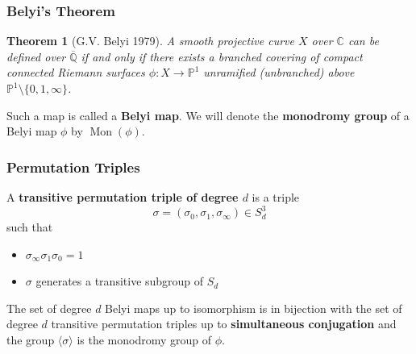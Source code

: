 \documentclass[handout, xcolor=dvipsnames]{beamer}
\DeclareMathOperator{\Mon}{Mon}
\theoremstyle{plain}
\newtheorem*{thm}{Theorem}
\newtheorem*{ques}{Question}
\newcommand{\CC}{\mathbb C}
\newcommand{\PP}{\mathbb P}
\newcommand{\Q}{\mathbb Q}
\newcommand{\defi}[1]{\textbf{#1}} 				%
\begin{document}
  \begin{frame}[plain]
    \frametitle{Belyi's Theorem}
    \begin{thm}[G.V. Belyi 1979]
      A smooth projective curve $X$ over $\CC$
      can be defined over $\overline{\Q}$ if and only if there
      exists a branched covering of compact connected Riemann surfaces $\phi:X\to\PP^1$
      unramified (unbranched) above $\PP^1\setminus\{0,1,\infty\}$.
    \end{thm}
    \pause
    Such a map is called a \textbf{Belyi map}.
    We will denote the \textbf{monodromy group} of a Belyi map $\phi$ by $\Mon(\phi)$.
  \end{frame}
  \begin{frame}[plain]
    \frametitle{Permutation Triples}
    A \textbf{transitive permutation triple of degree $d$} is a triple
    \[
      \sigma = (\sigma_0, \sigma_1, \sigma_\infty)\in S_d^3
    \]
    such that
    \begin{itemize}
      \item
        $\sigma_\infty\sigma_1\sigma_0=1$
      \item
        $\sigma$ generates a transitive subgroup of $S_d$
    \end{itemize}
    \pause
    The set of degree $d$ Belyi maps up to isomorphism is in bijection with the
    set of degree $d$ transitive permutation triples up to
    \textbf{simultaneous conjugation} and
    the group $\langle\sigma\rangle$ is the monodromy group of $\phi$.
  \end{frame}
\end{document}
